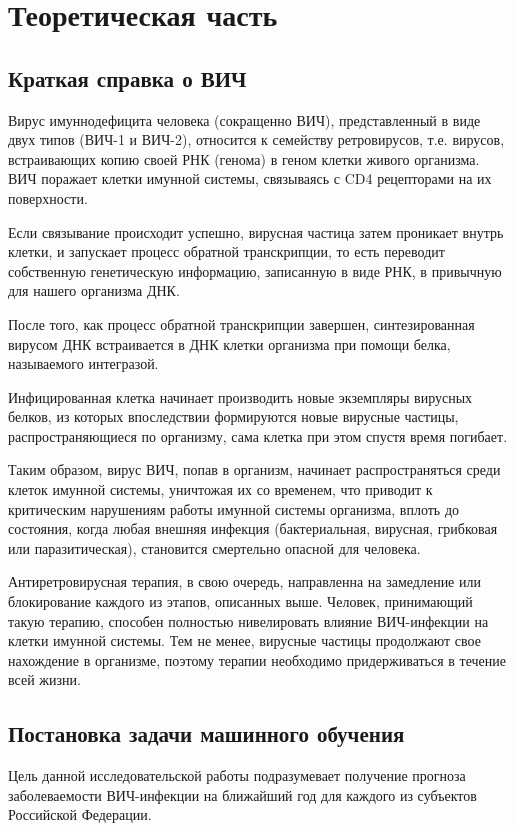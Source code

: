 \chapter{Теоретическая часть}
\label{ch:theory}

\section{Краткая справка о ВИЧ}
\linespread{1.5}
    Вирус имуннодефицита человека (сокращенно ВИЧ), представленный в виде двух типов (ВИЧ-1 и ВИЧ-2), относится к семейству ретровирусов, т.е. вирусов, встраивающих копию своей РНК (генома) в геном клетки живого организма. ВИЧ поражает клетки имунной системы, связываясь с CD4 рецепторами на их поверхности.

    Если связывание происходит успешно, вирусная частица затем проникает внутрь клетки, и запускает процесс обратной транскрипции, то есть переводит собственную генетическую информацию, записанную в виде РНК, в привычную для нашего организма ДНК.

    После того, как процесс обратной транскрипции завершен, синтезированная вирусом ДНК встраивается в ДНК клетки организма при помощи белка, называемого интегразой. 

    Инфицированная клетка начинает производить новые экземпляры вирусных белков, из которых
    впоследствии формируются новые вирусные частицы, распространяющиеся по организму, сама клетка при этом спустя время погибает.

    Таким образом, вирус ВИЧ, попав в организм, начинает распространяться среди клеток имунной системы, уничтожая их со временем, что приводит к критическим нарушениям работы имунной системы организма, вплоть до состояния, когда любая внешняя инфекция (бактериальная, вирусная, грибковая или паразитическая), становится смертельно опасной для человека.

    Антиретровирусная терапия, в свою очередь, направленна на замедление или блокирование каждого из этапов, описанных выше. Человек, принимающий такую терапию, способен полностью нивелировать влияние ВИЧ-инфекции на клетки имунной системы. Тем не менее, вирусные частицы продолжают свое нахождение в организме, поэтому терапии необходимо придерживаться в течение всей жизни.


\section{Постановка задачи машинного обучения}
\linespread{1.5}
    Цель данной исследовательской работы подразумевает получение  прогноза заболеваемости ВИЧ-инфекции на ближайший год для каждого из субъектов Российской Федерации.

